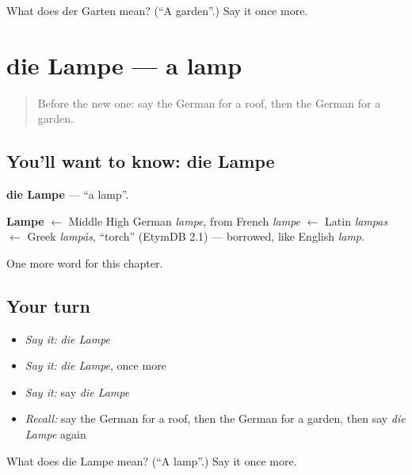 \begin{tcolorbox}[breakable,colback=teal!4,colframe=teal!35!black,title={Before you move on}]
What does der Garten mean? (\textquotedblleft{}A garden\textquotedblright{}.) Say it once more.
\end{tcolorbox}
\section[die Lampe]{die Lampe — a lamp}

\label{lesson:GE-C77-lampe}



\begin{quote}
Before the new one: say the German for a roof, then the German for a garden.
\end{quote}

\subsection*{You'll want to know: die Lampe}
\textbf{die Lampe} — \textquotedblleft{}a lamp\textquotedblright{}.

\begin{cousinweb}
\textbf{Lampe} $\leftarrow$ Middle High German \emph{lampe}, from French \emph{lampe} $\leftarrow$ Latin \emph{lampas} $\leftarrow$ Greek \emph{lampás}, \textquotedblleft{}torch\textquotedblright{} (EtymDB 2.1) — borrowed, like English \emph{lamp}.
\end{cousinweb}

\begin{grammarlens}[title={What you've built}]
One more word for this chapter.
\end{grammarlens}

\subsection*{Your turn}
\begin{itemize}
\raggedright
  \item \emph{Say it:} \emph{die Lampe}
  \item \emph{Say it:} \emph{die Lampe}, once more
  \item \emph{Say it:} say \emph{die Lampe}
  \item \emph{Recall:} say the German for a roof, then the German for a garden, then say \emph{die Lampe} again
\end{itemize}

\begin{tcolorbox}[breakable,colback=teal!4,colframe=teal!35!black,title={Before you move on}]
What does die Lampe mean? (\textquotedblleft{}A lamp\textquotedblright{}.) Say it once more.
\end{tcolorbox}
